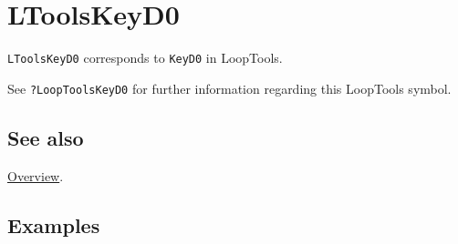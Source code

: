 \documentclass[../FeynHelpersManual.tex]{subfiles}
\begin{document}
\hypertarget{ltoolskeyd0}{
\section{LToolsKeyD0}\label{ltoolskeyd0}}

\texttt{LToolsKeyD0} corresponds to \texttt{KeyD0} in LoopTools.

See \texttt{?LoopTools\textasciigrave KeyD0} for further information
regarding this LoopTools symbol.

\subsection{See also}

\hyperlink{toc}{Overview}.

\subsection{Examples}
\end{document}

